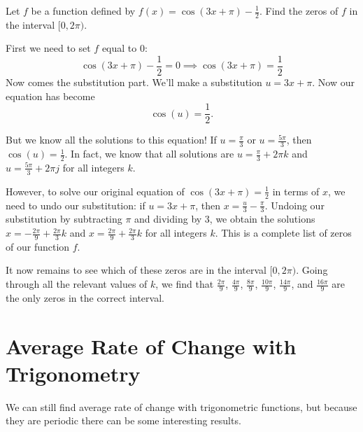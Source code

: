 \documentclass{ximera}
\begin{document}
\begin{example}
Let $f$ be a function defined by $f(x)=\cos(3x + \pi) - \frac{1}{2}$. Find the zeros of $f$ in the interval $[0, 2\pi)$.
\begin{explanation}
First we need to set $f$ equal to $0$:
$$\cos(3x + \pi) - \frac{1}{2} = 0 \implies \cos(3x + \pi) = \frac{1}{2}$$
Now comes the substitution part. We'll make a substitution $u = 3x + \pi$. Now our equation has become
$$\cos(u) = \frac{1}{2}.$$

But we know all the solutions to this equation! If $u = \frac{\pi}{3}$ or $u = \frac{5\pi}{3}$, then $\cos(u) = \frac{1}{2}$. In fact, we know that all solutions are $u = \frac{\pi}{3} + 2\pi k$ and $u = \frac{5\pi}{3} + 2\pi j$ for all integers $k$.

However, to solve our original equation of $\cos(3x + \pi) = \frac{1}{2}$ in terms of $x$, we need to undo our substitution: if $u = 3x + \pi$, then $x = \frac{u}{3} - \frac{\pi}{3}$. Undoing our substitution by subtracting $\pi$ and dividing by $3$, we obtain the solutions $x = -\frac{2\pi}{9} + \frac{2\pi}{3} k$ and $x = \frac{2\pi}{9} + \frac{2\pi}{3} k$ for all integers $k$. This is a complete list of zeros of our function $f$.   

It now remains to see which of these zeros are in the interval $[0, 2\pi)$. Going through all the relevant values of $k$, we find that $\frac{2\pi}{9}$, $\frac{4\pi}{9}$, $\frac{8\pi}{9}$, $\frac{10\pi}{9}$, $\frac{14\pi}{9}$, and $\frac{16\pi}{9}$ are the only zeros in the correct interval.  
\end{explanation}
\end{example}

\section{Average Rate of Change with Trigonometry}

We can still find average rate of change with trigonometric functions, but because they are periodic there can be some interesting results.
\end{document}
